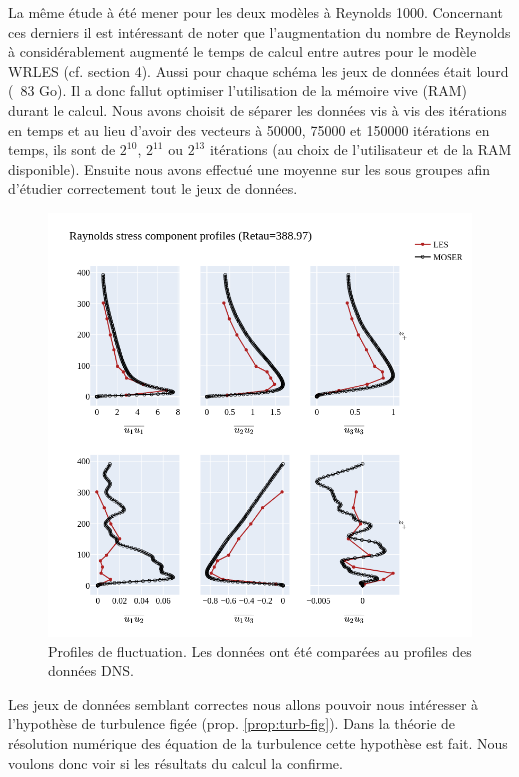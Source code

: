 \documentclass[12pt]{article}
\theoremstyle{plain}
\theoremstyle{remark}
\begin{document}
La même étude à été mener pour les deux modèles à Reynolds 1000. Concernant ces derniers il est intéressant de noter que l'augmentation du nombre de Reynolds à considérablement augmenté le temps de calcul entre autres pour le modèle WRLES (cf. section 4). Aussi pour chaque schéma les jeux de données était lourd (~83 Go). Il a donc fallut optimiser l'utilisation de la mémoire vive (RAM) durant le calcul. Nous avons choisit de séparer les données vis à vis des itérations en temps et au lieu d'avoir des vecteurs à 50000, 75000 et 150000 itérations en temps, ils sont de $2^10$, $2^11$ ou $2^13$ itérations (au choix de l'utilisateur et de la RAM disponible). Ensuite nous avons effectué une moyenne sur les sous groupes afin d'étudier correctement tout le jeux de données.\\

\begin{figure}[H]
	\begin{center}
		\includegraphics[width=0.8\linewidth]{../../output/figures/channel_wrles_retau395/split_time/RANS/var_velocity_profiles_all.png}
		\caption{Profiles de fluctuation. Les données ont été comparées au profiles des données DNS.}
		\label{fig:fluct-vel}
	\end{center}
\end{figure}

Les jeux de données semblant correctes nous allons pouvoir nous intéresser à l'hypothèse de turbulence figée (prop. \ref{prop:turb-fig}). Dans la théorie de résolution numérique des équation de la turbulence cette hypothèse est fait. Nous voulons donc voir si les résultats du calcul la confirme. 
\end{document}
